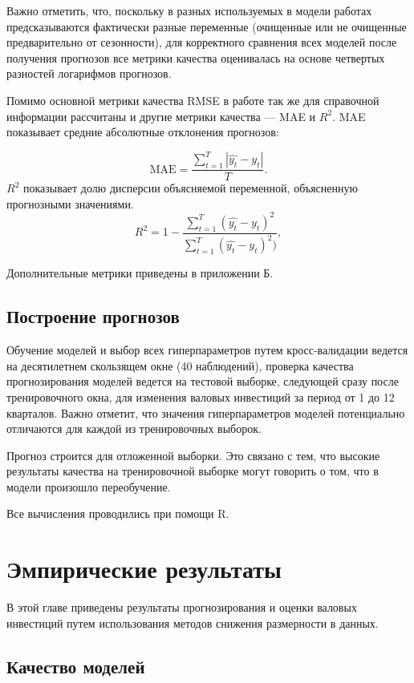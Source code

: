 Важно отметить, что, поскольку в разных используемых в модели работах предсказываются фактически разные переменные (очищенные или не очищенные предварительно от сезонности), для корректного сравнения всех моделей после получения прогнозов все метрики качества оценивалась на основе четвертых разностей логарифмов прогнозов.

Помимо основной метрики качества RMSE в работе так же для справочной информации рассчитаны и другие метрики качества --- MAE и $R^2$.
MAE показывает средние абсолютные отклонения прогнозов:

\begin{equation}
    \text{MAE} =  \frac{\sum_{t = 1}^{T} |\hat{y_t} - y_t|}{T}.
\end{equation}
$R^2$ показывает долю дисперсии объясняемой переменной, объясненную прогнозными значениями.
\begin{equation}
    R^2 = 1 -\frac{ \sum_{t = 1}^{T}(\hat{y_t} - y_t)^2}{\sum_{t = 1}^{T}(\hat{y_t} - y_t)^2)},
\end{equation}

Дополнительные метрики приведены в приложении Б.

\section{Построение прогнозов}

Обучение моделей и выбор всех гиперпараметров путем кросс-валидации ведется на десятилетнем скользящем окне (40 наблюдений), проверка качества прогнозирования моделей ведется на тестовой выборке, следующей сразу после тренировочного окна, для изменения валовых инвестиций за период от 1 до 12 кварталов. Важно отметит, что значения гиперпараметров моделей потенциально отличаются для каждой из тренировочных выборок. 

Прогноз строится для отложенной выборки. Это связано с тем, что высокие результаты качества на тренировочной выборке могут говорить о том, что в модели произошло переобучение.

Все вычисления проводились при помощи R.

\chapter{Эмпирические результаты}\label{ch:results}
В этой главе приведены результаты прогнозирования и оценки валовых инвестиций путем использования методов снижения размерности в данных.
\section{Качество моделей}


